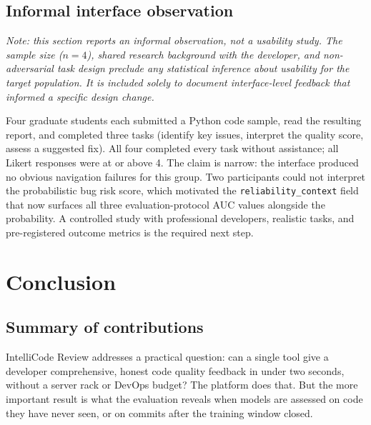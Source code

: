 \documentclass[12pt, oneside]{report}
\begin{document}
\section{Informal interface observation}
\label{ssec:peer-eval}

\textit{Note: this section reports an informal observation, not a usability study. The sample size ($n = 4$), shared research background with the developer, and non-adversarial task design preclude any statistical inference about usability for the target population. It is included solely to document interface-level feedback that informed a specific design change.}

Four graduate students each submitted a Python code sample, read the resulting report, and completed three tasks (identify key issues, interpret the quality score, assess a suggested fix). All four completed every task without assistance; all Likert responses were at or above 4. The claim is narrow: the interface produced no obvious navigation failures for this group. Two participants could not interpret the probabilistic bug risk score, which motivated the \texttt{reliability\_context} field that now surfaces all three evaluation-protocol AUC values alongside the probability. A controlled study with professional developers, realistic tasks, and pre-registered outcome metrics is the required next step.

\chapter{Conclusion}
\label{ch:conclusion}

\section{Summary of contributions}
\label{sec:contributions}

IntelliCode Review addresses a practical question: can a single tool give a developer comprehensive, honest code quality feedback in under two seconds, without a server rack or DevOps budget? The platform does that. But the more important result is what the evaluation reveals when models are assessed on code they have never seen, or on commits after the training window closed.
\end{document}
